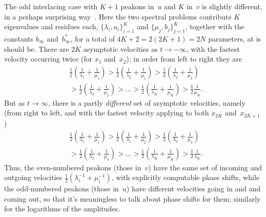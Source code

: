 \documentclass[10pt,a4paper]{article} \pdfoutput=1 
\begin{document}
The odd interlacing case with $K+1$ peakons in~$u$ and $K$ in~$v$
is slightly different, in a perhaps surprising way~\cite{shuaib-lundmark:2019:GX-noninterlacing}.
Here the two spectral problems contribute $K$ eigenvalues and residues each,
$\{ \lambda_i, a_i \}_{i=1}^K$
and
$\{ \mu_j, b_j \}_{j=1}^K$,
together with the constants $b_\infty$ and~$b_\infty^*$,
for a total of $4K+2 = 2(2K+1) = 2N$ parameters, at is should be.
There are $2K$ asymptotic velocities as $t \to -\infty$,
with the fastest velocity occurring twice (for $x_1$ and~$x_2$);
in order from left to right they are
\begin{equation}
  \begin{split}
    &
    \frac12 \left( \frac{1}{\lambda_1} + \frac{1}{\mu_1} \right)
    > \frac12 \left( \frac{1}{\lambda_2} + \frac{1}{\mu_1} \right)
    > \frac12 \left( \frac{1}{\lambda_2} + \frac{1}{\mu_2} \right)
    \\ &
    > \frac12 \left( \frac{1}{\lambda_3} + \frac{1}{\mu_2} \right)
    > \dots
    > \frac12 \left( \frac{1}{\lambda_K} + \frac{1}{\mu_K} \right)
    > \frac12 \frac{1}{\mu_K}
    .
  \end{split}
\end{equation}
But as $t \to \infty$, there is a partly \emph{different} set of asymptotic velocities,
namely (from right to left, and with the fastest velocity applying to both
$x_{2K}$ and~$x_{2K+1}$)
\begin{equation}
  \begin{split}
    &
    \frac12 \left( \frac{1}{\lambda_1} + \frac{1}{\mu_1} \right)
    > \frac12 \left( \frac{1}{\lambda_1} + \frac{1}{\mu_2} \right)
    > \frac12 \left( \frac{1}{\lambda_2} + \frac{1}{\mu_2} \right)
    \\ &
    > \frac12 \left( \frac{1}{\lambda_2} + \frac{1}{\mu_3} \right)
    > \dots
    > \frac12 \left( \frac{1}{\lambda_K} + \frac{1}{\mu_K} \right)
    > \frac12 \frac{1}{\lambda_K}
    .
  \end{split}
\end{equation}
Thus, the even-numbered peakons (those in~$v$) have the same set of incoming and outgoing velocities
$\frac12 \left( \lambda_i^{-1} + \mu_i^{-1} \right)$,
with explicitly computable phase shifts,
while the odd-numbered peakons (those in~$u$) have different velocities going in and and coming out,
so that it's meaningless to talk about phase shifts for them;
similarly for the logarithms of the amplitudes.
\end{document}
